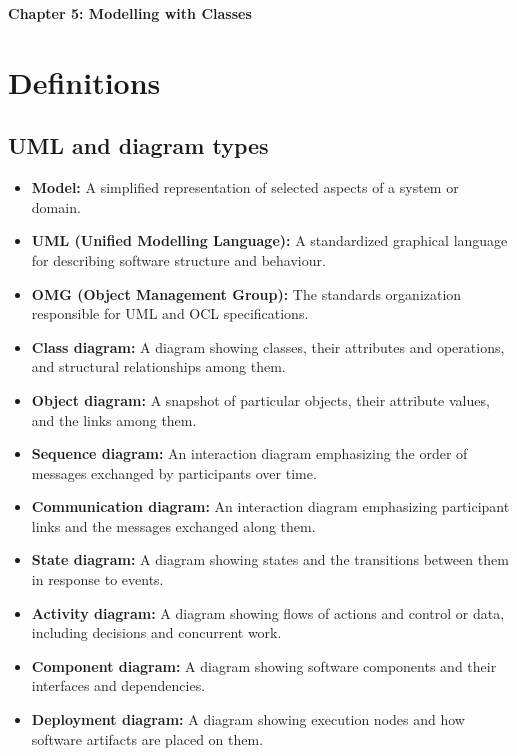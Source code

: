 \documentclass[11pt]{article}
\newcommand{\Title}[1]{%
  \begin{center}
    \fontsize{16}{28}\selectfont\textbf{#1}
  \end{center}
}
\newenvironment{DottedList}{%
  \begin{itemize}[leftmargin=2em, itemsep=0.35em, topsep=0.35em, label=\textbullet]
}{%
  \end{itemize}
}
\begin{document}
\Title{Chapter 5: Modelling with Classes}
\section*{Definitions}
\subsection*{UML and diagram types}
\begin{DottedList}
  \item \textbf{Model:} A simplified representation of selected aspects of a system or domain.
  \item \textbf{UML (Unified Modelling Language):} A standardized graphical language for describing software structure and behaviour.
  \item \textbf{OMG (Object Management Group):} The standards organization responsible for UML and OCL specifications.
  \item \textbf{Class diagram:} A diagram showing classes, their attributes and operations, and structural relationships among them.
  \item \textbf{Object diagram:} A snapshot of particular objects, their attribute values, and the links among them.
  \item \textbf{Sequence diagram:} An interaction diagram emphasizing the order of messages exchanged by participants over time.
  \item \textbf{Communication diagram:} An interaction diagram emphasizing participant links and the messages exchanged along them.
  \item \textbf{State diagram:} A diagram showing states and the transitions between them in response to events.
  \item \textbf{Activity diagram:} A diagram showing flows of actions and control or data, including decisions and concurrent work.
  \item \textbf{Component diagram:} A diagram showing software components and their interfaces and dependencies.
  \item \textbf{Deployment diagram:} A diagram showing execution nodes and how software artifacts are placed on them.
\end{DottedList}
\end{document}
